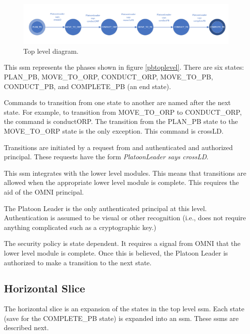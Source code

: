 \documentclass[../../main/main.tex]{subfiles}
\begin{document}
\begin{figure}[h!]
\centering
\includegraphics[width=\textwidth]{../figures/ssmPBDiagram}
\caption{\label{ssmPBDiagram} Top level diagram.}
\end{figure}

This \gls{ssm} represents the phases shown in figure \ref{pbtoplevel}.  There are six states: PLAN_PB, MOVE_TO_ORP, CONDUCT_ORP, MOVE_TO_PB, CONDUCT_PB, and COMPLETE_PB (an end state).  

Commands to transition from one state to another are named after the next state.  For example, to transition from MOVE_TO_ORP to CONDUCT_ORP, the command is conductORP.  The transition from the PLAN_PB state to the MOVE_TO_ORP state is the only exception.  This command is crossLD.  

Transitions are initiated by a request from and authenticated and authorized principal.  These requests have the form \textit{PlatoonLeader says crossLD}.

This \gls{ssm} integrates with the lower level modules.  This means that transitions are allowed when the appropriate lower level module is complete.  This requires the aid of the OMNI principal.

The Platoon Leader is the only authenticated principal at this level.  Authentication is assumed to be visual or other recognition (i.e., does not require anything complicated such as a cryptographic key.)

The security policy is state dependent.  It requires a signal from OMNI that the lower level module is complete.  Once this is believed, the Platoon Leader is authorized to make a transition to the next state.  

 \clearpage

\subsection{Horizontal Slice}\label{ssec:horizontalslice}
The horizontal slice is an expansion of the states in the top level \gls{ssm}.  Each state (save for the COMPLETE_PB state) is expanded into an \gls{ssm}.  These \gls{ssm}s are described next.
\end{document}
